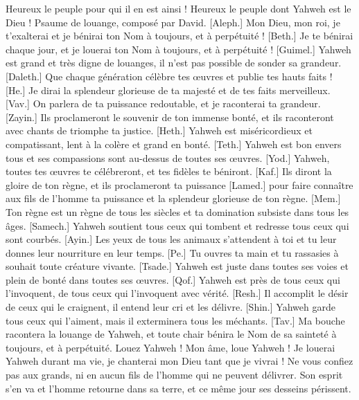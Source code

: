 \begin{multicols}{2}
Heureux le peuple pour qui il en est ainsi ! Heureux le peuple dont Yahweh est le Dieu !
\VerseOne{}Psaume de louange, composé par David. [Aleph.] Mon Dieu, mon roi, je t'exalterai et je bénirai ton Nom à toujours, et à perpétuité !
[Beth.] Je te bénirai chaque jour, et je louerai ton Nom à toujours, et à perpétuité !
[Guimel.] Yahweh est grand et très digne de louanges, il n'est pas possible de sonder sa grandeur.
[Daleth.] Que chaque génération célèbre tes œuvres et publie tes hauts faits !
[He.] Je dirai la splendeur glorieuse de ta majesté et de tes faits merveilleux.
[Vav.] On parlera de ta puissance redoutable, et je raconterai ta grandeur.
[Zayin.] Ils proclameront le souvenir de ton immense bonté, et ils raconteront avec chants de triomphe ta justice.
[Heth.] Yahweh est miséricordieux et compatissant, lent à la colère et grand en bonté.
[Teth.] Yahweh est bon envers tous et ses compassions sont au-dessus de toutes ses œuvres.
[Yod.] Yahweh, toutes tes œuvres te célébreront, et tes fidèles te béniront.
[Kaf.] Ils diront la gloire de ton règne, et ils proclameront ta puissance
[Lamed.] pour faire connaître aux fils de l'homme ta puissance et la splendeur glorieuse de ton règne.
[Mem.] Ton règne est un règne de tous les siècles et ta domination subsiste dans tous les âges.
[Samech.] Yahweh soutient tous ceux qui tombent et redresse tous ceux qui sont courbés.
[Ayin.] Les yeux de tous les animaux s'attendent à toi et tu leur donnes leur nourriture en leur temps.
[Pe.] Tu ouvres ta main et tu rassasies à souhait toute créature vivante.
[Tsade.] Yahweh est juste dans toutes ses voies et plein de bonté dans toutes ses œuvres.
[Qof.] Yahweh est près de tous ceux qui l'invoquent, de tous ceux qui l'invoquent avec vérité.
[Resh.] Il accomplit le désir de ceux qui le craignent, il entend leur cri et les délivre.
[Shin.] Yahweh garde tous ceux qui l'aiment, mais il exterminera tous les méchants.
[Tav.] Ma bouche racontera la louange de Yahweh, et toute chair bénira le Nom de sa sainteté à toujours, et à perpétuité.
\VerseOne{}Louez Yahweh ! Mon âme, loue Yahweh !
Je louerai Yahweh durant ma vie, je chanterai mon Dieu tant que je vivrai !
Ne vous confiez pas aux grands, ni en aucun fils de l'homme qui ne peuvent délivrer.
Son esprit s'en va et l'homme retourne dans sa terre, et ce même jour ses desseins périssent.

\end{multicols}

